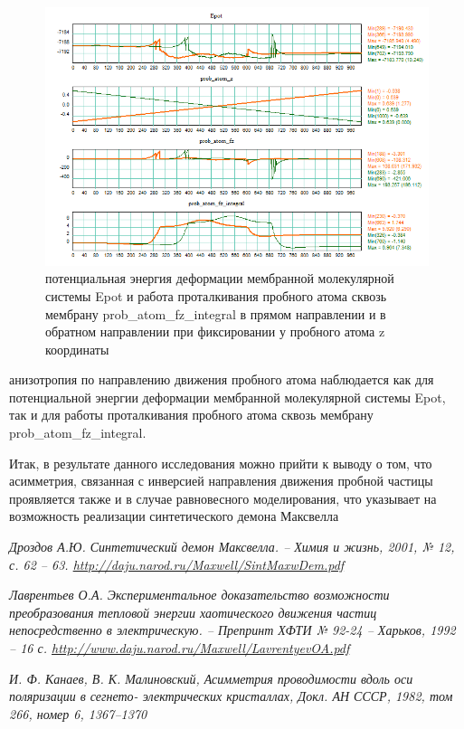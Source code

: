 \documentclass[12pt]{article}
\begin{document}
\begin{figure}
    \centering
    \includegraphics[scale=0.7]{./molecules/nanotrubki/12_0/work_6H_CN_He/4_plots_1001_nstep=500_fix_z.png}
    \caption{потенциальная энергия деформации мембранной молекулярной системы Epot и работа проталкивания пробного атома сквозь мембрану prob\_atom\_fz\_integral в прямом направлении и в обратном направлении при фиксировании у пробного атома z координаты}
    \label{fig:frame_center}
\end{figure}


анизотропия по направлению движения пробного атома наблюдается как для потенциальной энергии деформации мембранной молекулярной системы Epot, так и для работы проталкивания пробного атома сквозь мембрану prob\_atom\_fz\_integral. 

Итак, в результате данного исследования можно прийти к выводу о том, что асимметрия, связанная с инверсией направления движения пробной частицы проявляется также и в случае равновесного моделирования, что указывает на возможность реализации синтетического демона Максвелла


\begin{thebibliography}{99}

\textit{ Дроздов А.Ю. Синтетический демон Максвелла. – Химия и жизнь, 2001, № 12, с. 62 – 63. \url{http://daju.narod.ru/Maxwell/SintMaxwDem.pdf} }

\textit{ Лаврентьев О.А. Экспериментальное доказательство возможности преобразования тепловой энергии хаотического движения частиц непосредственно в электрическую. – Препринт ХФТИ № 92-24 – Харьков, 1992 – 16 с. \url{http://www.daju.narod.ru/Maxwell/LavrentyevOA.pdf} }

\textit{И. Ф. Канаев, В. К. Малиновский, Асимметрия
проводимости вдоль оси поляризации в сегнето-
электрических кристаллах, Докл. АН СССР, 1982,
том 266, номер 6, 1367–1370}

\end{thebibliography}
\end{document}
